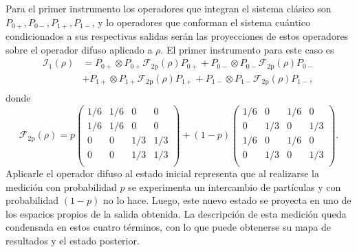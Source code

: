 Para el primer instrumento  los operadores que integran el sistema clásico son
$P_{0+},P_{0-},P_{1+},P_{1-}$, y lo operadores que conforman el sistema
cuántico condicionados a sus respectivas salidas serán las proyecciones de
estos operadores sobre el operador difuso aplicado a $\rho$. El primer
instrumento para este caso es 
\[\begin{split}
\mathcal{I}_1(\rho)&=P_{0+}\otimes P_{0+}\mathcal{F}_{2\text{p}}(\rho)P_{0+}+P_{0-}\otimes P_{0-}\mathcal{F}_{2\text{p}}(\rho)P_{0-}\\
    &+ P_{1+}\otimes P_{1+}\mathcal{F}_{2\text{p}}(\rho)P_{1+}+P_{1-}\otimes P_{1-}\mathcal{F}_{2\text{p}}(\rho)P_{1-}, \\
\end{split} \]
donde 
\[\mathcal{F}_{2\text{p}}(\rho)= p\begin{pmatrix}
        1/6&1/6&0&0\\
        1/6&1/6&0&0\\
        0&0&1/3&1/3\\
        0&0&1/3&1/3\\
    \end{pmatrix}
+ (1-p)\begin{pmatrix} 1/6&0&1/6&0\\ 0&1/3&0&1/3\\ 1/6&0&1/6&0\\ 0&1/3&0&1/3\\ \end{pmatrix}.
\] Aplicarle el operador difuso al estado inicial representa que al realizarse
la medición con probabilidad $p$ se experimenta un intercambio de partículas y
con probabilidad $(1-p)$ no lo hace. Luego, este nuevo estado se proyecta en
uno de los espacios propios de la salida obtenida.
La descripción de esta medición queda
condensada en estos cuatro términos, con lo que puede obtenerse su mapa de
resultados y el estado posterior. 
   
